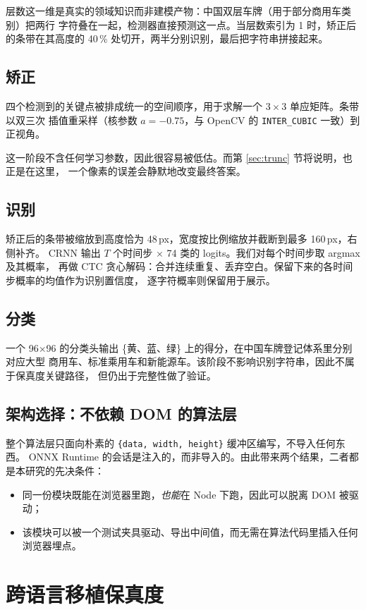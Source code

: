 \documentclass[UTF8,a4paper,11pt]{ctexart}
\begin{document}
层数这一维是真实的领域知识而非建模产物：中国双层车牌（用于部分商用车类别）把两行
字符叠在一起，检测器直接预测这一点。当层数索引为 1 时，矫正后的条带在其高度的 40\,\%
处切开，两半分别识别，最后把字符串拼接起来。

\subsection{矫正}
四个检测到的关键点被排成统一的空间顺序，用于求解一个 $3\times3$ 单应矩阵。条带以双三次
插值重采样（核参数 $a=-0.75$，与 OpenCV 的 \texttt{INTER\_CUBIC} 一致）到正视角。

这一阶段不含任何学习参数，因此很容易被低估。而第 \ref{sec:trunc} 节将说明，也正是在这里，
一个像素的误差会静默地改变最终答案。

\subsection{识别}
矫正后的条带被缩放到高度恰为 48\,px，宽度按比例缩放并截断到最多 160\,px，右侧补齐。
CRNN 输出 $T$ 个时间步 $\times$ 74 类的 logits。我们对每个时间步取 argmax 及其概率，
再做 CTC 贪心解码：合并连续重复、丢弃空白。保留下来的各时间步概率的均值作为识别置信度，
逐字符概率则保留用于展示。

\subsection{分类}
一个 96$\times$96 的分类头输出 \{黄、蓝、绿\} 上的得分，在中国车牌登记体系里分别对应大型
商用车、标准乘用车和新能源车。该阶段不影响识别字符串，因此不属于保真度关键路径，
但仍出于完整性做了验证。

\subsection{架构选择：不依赖 DOM 的算法层}
整个算法层只面向朴素的 \texttt{\{data, width, height\}} 缓冲区编写，不导入任何东西。
ONNX Runtime 的会话是注入的，而非导入的。由此带来两个结果，二者都是本研究的先决条件：
\begin{itemize}
\item 同一份模块既能在浏览器里跑，\emph{也能}在 Node 下跑，因此可以脱离 DOM 被驱动；
\item 该模块可以被一个测试夹具驱动、导出中间值，而无需在算法代码里插入任何浏览器埋点。
\end{itemize}

\section{跨语言移植保真度}
\label{sec:fidelity}
\end{document}
